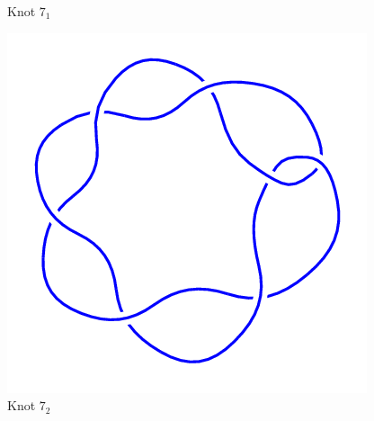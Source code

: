 \documentclass{article}
\begin{document}
\begin{figure}[!htb]
\caption{Knot $7_1$}
\endminipage\hfill
{}
\includegraphics[width=\linewidth]{7_2.png}
\caption{Knot $7_2$}
\endminipage\hfill
\end{figure}
\end{document}
